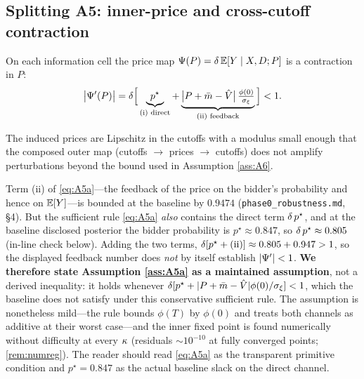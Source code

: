 \subsection{Splitting A5: inner-price and cross-cutoff contraction}
\label{ssub:price}

\begin{assumption}
\label{ass:A5a}
On each information cell the price map $\Psi(P)=\delta\,\mathbb{E}[Y\mid X,D;P]$ is a
contraction in $P$:
\begin{equation}
\label{eq:A5a}
\bigl|\Psi'(P)\bigr|
=\delta\Bigl[\,\underbrace{p^\star}_{\text{(i) direct}}
+\underbrace{\bigl|P+\bar{m}-\hat{V}\bigr|\,\tfrac{\phi(0)}{\sigma_\xi}}_{\text{(ii) feedback}}\,\Bigr]
<1 .
\end{equation}
\end{assumption}

\begin{assumption}
\label{ass:A5b}
The induced prices are Lipschitz in the cutoffs with a modulus small enough that
the composed outer map (cutoffs $\to$ prices $\to$ cutoffs) does not amplify
perturbations beyond the bound used in Assumption \ref{ass:A6}.
\end{assumption}

\begin{remark}
\label{rem:A5margins}
Term (ii) of \eqref{eq:A5a}---the feedback of the price on the bidder's
probability and hence on $\mathbb{E}[Y]$---is bounded at the baseline by $0.9474$
(\texttt{phase0\_robustness.md}, \S4). But the sufficient rule \eqref{eq:A5a}
\emph{also} contains the direct term $\delta\,p^\star$, and at the baseline
disclosed posterior the bidder probability is $p^\star\approx0.847$, so
$\delta\,p^\star\approx0.805$ (in-line check below). Adding the two terms,
$\delta[p^\star+(\text{ii})]\approx0.805+0.947>1$, so the displayed feedback
number does \emph{not} by itself establish $|\Psi'|<1$. \textbf{We therefore
state Assumption \ref{ass:A5a} as a maintained assumption}, not a derived
inequality: it holds whenever
$\delta[p^\star+|P+\bar{m}-\hat{V}|\phi(0)/\sigma_\xi]<1$, which the baseline does not
satisfy under this conservative sufficient rule. The assumption is nonetheless
mild---the rule bounds $\phi(T)$ by $\phi(0)$ and treats both channels as
additive at their worst case---and the inner fixed point is found numerically
without difficulty at every $\kappa$ (residuals $\sim10^{-10}$ at fully converged
points; \ref{rem:numreg}). The reader should read \eqref{eq:A5a} as the
transparent primitive condition and $p^\star=0.847$ as the actual baseline slack
on the direct channel.
\end{remark}

